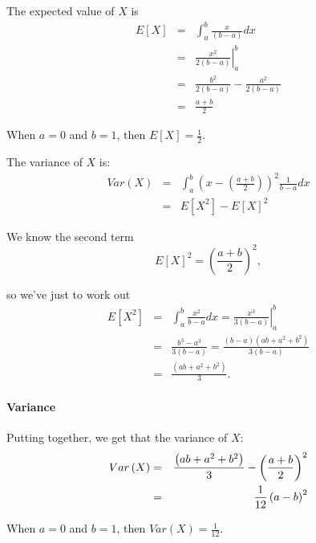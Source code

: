 \documentclass[notes=show,smaller]{beamer}\usepackage[]{graphicx}\usepackage[]{color}
\begin{document}
\begin{frame}{\subsecname}
  The expected value of $X$ is
  \begin{eqnarray*}
  E\left[ X\right] &=&\int_{a}^{b}\frac{x}{\left( b-a\right) }dx \\
  &=&\left. \frac{x^{2}}{2\left( b-a\right) }\right\vert _{a}^{b} \\
  &=&\frac{b^{2}}{2\left( b-a\right) }-\frac{a^{2}}{2\left( b-a\right) } \\
  &=&\frac{a+b}{2}
  \end{eqnarray*}

  \begin{example}
  When $a=0$ and $b=1$, then $E\left[ X\right] =\frac{1}{2}$.
  \end{example}
\end{frame}


\begin{frame}{\subsecname}
  The variance of $X$ is:
  \begin{eqnarray*}
  Var\left( X\right) &=&\int_{a}^{b}\left( x-\left( \frac{a+b}{2}\right)
  \right) ^{2}\frac{1}{b-a}dx \\
  &=&E\left[ X^{2}\right] -E\left[ X\right] ^{2}
  \end{eqnarray*}

  We know the second term
  \begin{equation*}
  E\left[ X\right] ^{2}=\left( \frac{a+b}{2}\right) ^{2},
  \end{equation*}

  so we've just to work out%
  \begin{eqnarray*}
  E\left[ X^{2}\right] &=&\int_{a}^{b}\frac{x^{2}}{b-a}dx =\left. \frac{x^{3}}{3\left( b-a\right) }\right\vert _{a}^{b} \\
  &=&\frac{b^{3}-a^{3}}{3\left( b-a\right) } = \frac{(b-a)\left( ab+a^{2}+b^{2}\right)}{3\left( b-a\right) } \\
  &=&\frac{\left( ab+a^{2}+b^{2}\right) }{3}.
  \end{eqnarray*}

\end{frame}

\begin{frame}{\subsecname}
  \framesubtitle{Variance}

  Putting together, we get that the variance of $X$:%
  \begin{eqnarray*}
  Var\left( X\right) &=&\frac{\left( ab+a^{2}+b^{2}\right) }{3}-\left( \frac{%
  a+b}{2}\right) ^{2} \\
  &=&\frac{1}{12}\left( a-b\right) ^{2}
  \end{eqnarray*}

  \begin{example} [continued]
  When $a=0$ and $b=1$, then $Var\left( X\right) =\frac{1}{12}$.
  \end{example}
\end{frame}%
\end{document}
